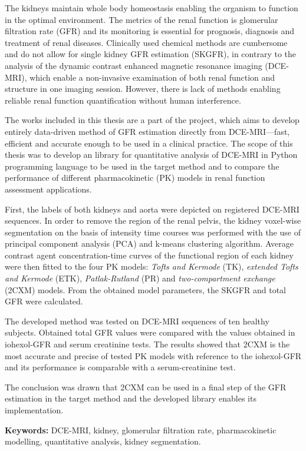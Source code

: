 	\begin{spacing}{1.0}
		\begin{small}

The kidneys maintain whole body homeostasis enabling the organism to function in the optimal environment. The metrics of the renal function is glomerular filtration rate (GFR) and its monitoring is essential for prognosis, diagnosis and treatment of renal diseases. Clinically used chemical methods are cumbersome and do not allow for single kidney GFR estimation (SKGFR),  in contrary to the analysis of the dynamic contrast enhanced magnetic resonance imaging  (DCE-MRI), which enable a non-invasive examination of both renal function and structure in one imaging session. However, there is lack of methods enabling reliable renal function quantification without human interference.

The works included in this thesis are a part of the project, which aims to develop entirely data-driven method of GFR estimation directly from DCE-MRI---fast, efficient and accurate enough to be used in a clinical practice. 
The scope of this thesis was to develop an library for quantitative analysis of DCE-MRI in Python programming language to be used in the target method and to compare the performance of different pharmacokinetic (PK) models in renal function assessment applications.

First, the labels of both kidneys and aorta were depicted on registered DCE-MRI sequences. In order to remove the region of the renal pelvis, the kidney voxel-wise segmentation on the basis of intensity time courses was performed with the use of principal component analysis (PCA) and k-means clustering algorithm. Average contrast agent concentration-time curves of the functional region of each kidney were then fitted to the four PK models: \textit{Tofts and Kermode} (TK), \textit{extended Tofts and Kermode} (ETK), \textit{Patlak-Rutland} (PR) and \textit{two-compartment exchange} (2CXM) models. From the obtained model parameters, the SKGFR and total GFR were calculated.   

The developed method was tested on DCE-MRI sequences of ten healthy subjects. Obtained total GFR values were compared with the values obtained in iohexol-GFR and serum creatinine tests.
The results showed that 2CXM is the most accurate and precise of tested PK models with reference to the iohexol-GFR and its performance is comparable with a serum-creatinine test. 

The conclusion was drawn that 2CXM can be used in a final step of the GFR estimation in the target method and the developed library enables its implementation.   

		
		
		\end{small}

		
		\vfill
		\normalsize \noindent \textbf{Keywords:} DCE-MRI, kidney, glomerular filtration rate, pharmacokinetic modelling, quantitative analysis, kidney segmentation.  
				
				\end{spacing}	

	\newpage
\thispagestyle{empty}
\mbox{}	

